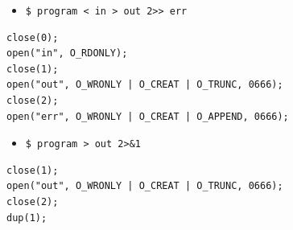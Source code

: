 
\begin{slide}
\begin{itemize}
\item \verb#$ program < in > out 2>> err#
\end{itemize}
\begin{verbatim}
close(0);
open("in", O_RDONLY);
close(1);
open("out", O_WRONLY | O_CREAT | O_TRUNC, 0666);
close(2);
open("err", O_WRONLY | O_CREAT | O_APPEND, 0666);
\end{verbatim}
\begin{itemize}
\item \verb#$ program > out 2>&1#
\end{itemize}
\begin{verbatim}
close(1);
open("out", O_WRONLY | O_CREAT | O_TRUNC, 0666);
close(2);
dup(1);
\end{verbatim}
\end{slide}

